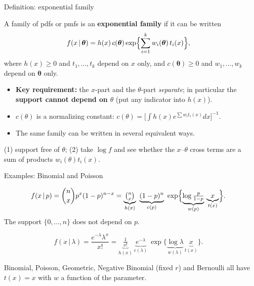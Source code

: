 \documentclass[aspectratio=169,t,10pt]{beamer}
\newcommand{\given}{\,|\,}
\begin{document}
\begin{frame}{Definition: exponential family}
  \begin{tcolorbox}[mydef={Definition (CB 3.4.1)}]\small
  A family of pdfs or pmfs is an \textbf{exponential family} if it can be written
  \[f(x\given\boldsymbol\theta)=h(x)\,c(\boldsymbol\theta)\exp\Bigl\{\sum_{i=1}^kw_i(\boldsymbol\theta)\,t_i(x)\Bigr\},\]
  where $h(x)\ge0$ and $t_1,\dots,t_k$ depend on $x$ only, and $c(\boldsymbol\theta)\ge0$ and $w_1,\dots,w_k$ depend on $\boldsymbol\theta$ only.
  \end{tcolorbox}
  \begin{itemize}\small
    \item \textbf{Key requirement:} the $x$-part and the $\theta$-part \emph{separate}; in particular the \textbf{support cannot depend on $\theta$} (put any indicator into $h(x)$).
    \item $c(\theta)$ is a normalizing constant: $c(\theta)=\bigl[\int h(x)e^{\sum w_it_i(x)}dx\bigr]^{-1}$.
    \item The same family can be written in several equivalent ways.
  \end{itemize}
  \begin{tcolorbox}[mynote={Checklist}]\small
  (1) support free of $\theta$; (2) take $\log f$ and see whether the $x$--$\theta$ cross terms are a sum of products $w_i(\theta)t_i(x)$.
  \end{tcolorbox}
\end{frame}

\begin{frame}{Examples: Binomial and Poisson}
  \begin{tcolorbox}[myex={Binomial$(n,p)$, $n$ known}]\small
  \[f(x\given p)=\binom nxp^x(1-p)^{n-x}=\underbrace{\tbinom nx}_{h(x)}\ \underbrace{(1-p)^n}_{c(p)}\ \exp\Bigl\{\underbrace{\log\tfrac p{1-p}}_{w(p)}\,\underbrace{x}_{t(x)}\Bigr\}.\]
  The support $\{0,\dots,n\}$ does not depend on $p$.
  \end{tcolorbox}
  \begin{tcolorbox}[myex={Poisson$(\lambda)$}]\small
  \[f(x\given\lambda)=\frac{e^{-\lambda}\lambda^x}{x!}=\underbrace{\tfrac1{x!}}_{h(x)}\ \underbrace{e^{-\lambda}}_{c(\lambda)}\ \exp\bigl\{\underbrace{\log\lambda}_{w(\lambda)}\,\underbrace{x}_{t(x)}\bigr\}.\]
  \end{tcolorbox}
  \begin{tcolorbox}[mynote={Pattern}]\small
  Binomial, Poisson, Geometric, Negative Binomial (fixed $r$) and Bernoulli all have $t(x)=x$ with $w$ a function of the parameter.
  \end{tcolorbox}
\end{frame}
\end{document}

